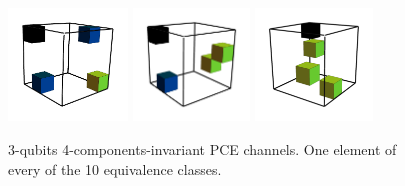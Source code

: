 \documentclass[11pt,dvipsnames]{article} %
\newcommand{\1}{\mathds{1}}
\begin{document}
\begin{figure}[H]
	\hfill
	\includegraphics[height=3cm]{img/3q-4c-no-3}
	\hfill
	\includegraphics[height=3cm]{img/3q-4c-no-4}
	\hfill
	\includegraphics[height=3cm]{img/3q-4c-no-5}
	\hfill \hfill
	\caption{3-qubits 4-components-invariant PCE channels. 
	One element of every of the 10 equivalence classes.}
	\label{fig:QC-3q-4c}
\end{figure}
\end{document}
